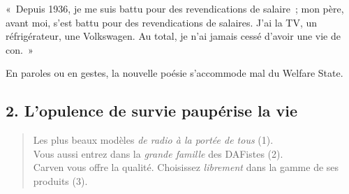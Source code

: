 \documentclass[french,twoside]{book} %
\newenvironment{quoteblock}%
  {\begin{quoting}}
  {\end{quoting}}
\newenvironment{quotebar}{%
    \def\FrameCommand{{\color{rubric!10!}\vrule width 0.5em} \hspace{0.9em}}%
    \def\OuterFrameSep{\itemsep} %
    \MakeFramed {\advance\hsize-\width \FrameRestore}
  }%
  {%
    \endMakeFramed
  }
\renewenvironment{quoteblock}%
  {%
    \savenotes
    \setstretch{0.9}
    \normalfont
    \begin{quotebar}
  }
  {%
    \end{quotebar}
    \spewnotes
  }
\begin{document}
\begin{quoteblock}
\noindent « Depuis 1936, je me suis battu pour des revendications de salaire ; mon père, avant moi, s’est battu pour des revendications de salaires. J’ai la TV, un réfrigérateur, une Volkswagen. Au total, je n’ai jamais cessé d’avoir une vie de con. »\end{quoteblock}

\noindent En paroles ou en gestes, la nouvelle poésie s’accommode mal du Welfare State.
\subsection[{2. L’opulence de survie paupérise la vie}]{\textsc{2.} L’opulence de survie paupérise la vie}


\begin{verse}
Les plus beaux modèles \emph{de radio à la portée de tous} (1).\\
Vous aussi entrez dans la \emph{grande famille} des DAFistes (2).\\
Carven vous offre la qualité. Choisissez \emph{librement} dans la gamme de ses produits (3).\\
\end{verse}
\end{document}
